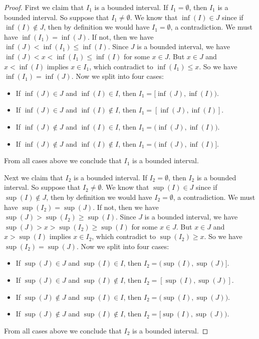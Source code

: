 \begin{proof}
  First we claim that \(I_1\) is a bounded interval.
  If \(I_1 = \emptyset\), then \(I_1\) is a bounded interval.
  So suppose that \(I_1 \neq \emptyset\).
  We know that \(\inf(I) \in J\) since if \(\inf(I) \notin J\), then by definition we would have \(I_1 = \emptyset\), a contradiction.
  We must have \(\inf(I_1) = \inf(J)\).
  If not, then we have \(\inf(J) < \inf(I_1) \leq \inf(I)\).
  Since \(J\) is a bounded interval, we have \(\inf(J) < x < \inf(I_1) \leq \inf(I)\) for some \(x \in J\).
  But \(x \in J\) and \(x < \inf(I)\) implies \(x \in I_1\), which contradict to \(\inf(I_1) \leq x\).
  So we have \(\inf(I_1) = \inf(J)\).
  Now we split into four cases:
  \begin{itemize}
    \item If \(\inf(J) \in J\) and \(\inf(I) \in I\), then \(I_1 = [\inf(J), \inf(I)\big)\).
    \item If \(\inf(J) \in J\) and \(\inf(I) \notin I\), then \(I_1 = [\inf(J), \inf(I)]\).
    \item If \(\inf(J) \notin J\) and \(\inf(I) \in I\), then \(I_1 = \big(\inf(J), \inf(I)\big)\).
    \item If \(\inf(J) \notin J\) and \(\inf(I) \notin I\), then \(I_1 = \big(\inf(J), \inf(I)]\).
  \end{itemize}
  From all cases above we conclude that \(I_1\) is a bounded interval.

  Next we claim that \(I_2\) is a bounded interval.
  If \(I_2 = \emptyset\), then \(I_2\) is a bounded interval.
  So suppose that \(I_2 \neq \emptyset\).
  We know that \(\sup(I) \in J\) since if \(\sup(I) \notin J\), then by definition we would have \(I_2 = \emptyset\), a contradiction.
  We must have \(\sup(I_2) = \sup(J)\).
  If not, then we have \(\sup(J) > \sup(I_2) \geq \sup(I)\).
  Since \(J\) is a bounded interval, we have \(\sup(J) > x > \sup(I_2) \geq \sup(I)\) for some \(x \in J\).
  But \(x \in J\) and \(x > \sup(I)\) implies \(x \in I_2\), which contradict to \(\sup(I_2) \geq x\).
  So we have \(\sup(I_2) = \sup(J)\).
  Now we split into four cases:
  \begin{itemize}
    \item If \(\sup(J) \in J\) and \(\sup(I) \in I\), then \(I_2 = \big(\sup(I), \sup(J)]\).
    \item If \(\sup(J) \in J\) and \(\sup(I) \notin I\), then \(I_2 = [\sup(I), \sup(J)]\).
    \item If \(\sup(J) \notin J\) and \(\sup(I) \in I\), then \(I_2 = \big(\sup(I), \sup(J)\big)\).
    \item If \(\sup(J) \notin J\) and \(\sup(I) \notin I\), then \(I_2 = [\sup(I), \sup(J)\big)\).
  \end{itemize}
  From all cases above we conclude that \(I_2\) is a bounded interval.


\end{proof}
